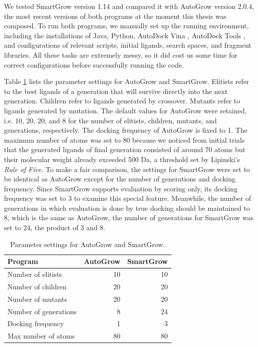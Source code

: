 We tested SmartGrow version 1.14 and compared it with AutoGrow version 2.0.4, the most recent versions of both programs at the moment this thesis was composed. To run both programs, we manually set up the running environment, including the installations of Java, Python, AutoDock Vina \citep{595-2010}, AutoDock Tools \citep{785-1999,596-2009}, and configurations of relevant scripts, initial ligands, search spaces, and fragment libraries. All these tasks are extremely messy, so it did cost us some time for correct configurations before successfully running the code.

Table \ref{tab:ParameterSettings} lists the parameter settings for AutoGrow and SmartGrow. Elitists refer to the best ligands of a generation that will survive directly into the next generation. Children refer to ligands generated by crossover. Mutants refer to ligands generated by mutation. The default values for AutoGrow were retained, i.e. 10, 20, 20, and 8 for the number of elitists, children, mutants, and generations, respectively. The docking frequency of AutoGrow is fixed to 1. The maximum number of atoms was set to 80 because we noticed from initial trials that the generated ligands of final generation consisted of around 70 atoms but their molecular weight already exceeded 500 Da, a threshold set by Lipinski's \textit{Rule of Five}. To make a fair comparison, the settings for SmartGrow were set to be identical as AutoGrow except for the number of generations and docking frequency. Since SmartGrow supports evaluation by scoring only, its docking frequency was set to 3 to examine this special feature. Meanwhile, the number of generations in which evaluation is done by true docking should be maintained to 8, which is the same as AutoGrow, the number of generations for SmartGrow was set to 24, the product of 3 and 8.

\begin{table}
\centering
\begin{tabular*}
{\textwidth}
{@{\extracolsep{\fill}}lrr}
\toprule
Program & AutoGrow & SmartGrow\\
\midrule
Number of elitists & 10 & 10\\
Number of children & 20 & 20\\
Number of mutants & 20 & 20\\
Number of generations & 8 & 24\\
Docking frequency & 1 & 3\\
Max number of atoms & 80 & 80\\
\bottomrule
\end{tabular*}
\caption{Parameter settings for AutoGrow and SmartGrow.}
\label{tab:ParameterSettings}
\end{table}

